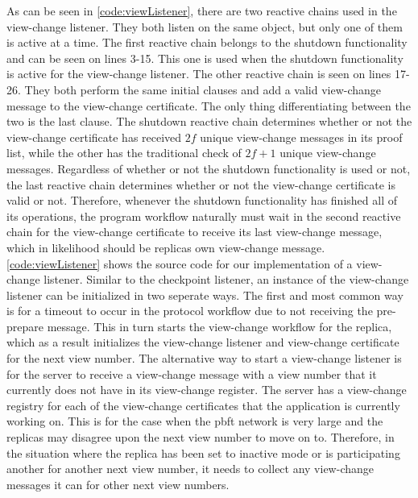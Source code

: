 As can be seen in \autoref{code:viewListener}, there are two reactive chains used in the view-change listener. They both listen on the same  object, but only one of them is active at a time. The first reactive chain belongs to the shutdown functionality and can be seen on lines 3-15. This one is used when the shutdown functionality is active for the view-change listener. The other reactive chain is seen on lines 17-26. They both perform the same initial  clauses and add a valid view-change message to the view-change certificate. The only thing differentiating between the two is the last  clause. The shutdown reactive chain determines whether or not the view-change certificate has received $2f$ unique view-change messages in its proof list, while the other has the traditional check of $2f+1$ unique view-change messages. Regardless of whether or not the shutdown functionality is used or not, the last reactive chain determines whether or not the view-change certificate is valid or not. Therefore, whenever the shutdown functionality has finished all of its operations, the program workflow naturally must wait in the second reactive chain for the view-change certificate to receive its last view-change message, which in likelihood should be replicas own view-change message.
\fi
\iffalse
\autoref{code:viewListener} shows the source code for our implementation of a view-change listener. Similar to the checkpoint listener, an instance of the view-change listener can be initialized in two seperate ways. The first and most common way is for a timeout to occur in the protocol workflow due to not receiving the pre-prepare message. This in turn starts the view-change workflow for the replica, which as a result initializes the view-change listener and view-change certificate for the next view number. The alternative way to start a view-change listener is for the server to receive a view-change message with a view number that it currently does not have in its view-change register. The server has a view-change registry for each of the view-change certificates that the application is currently working on. This is for the case when the \ac{pbft} network is very large and the replicas may disagree upon the next view number to move on to. Therefore, in the situation where the replica has been set to inactive mode or is participating another for another next view number, it needs to collect any view-change messages it can for other next view numbers.

